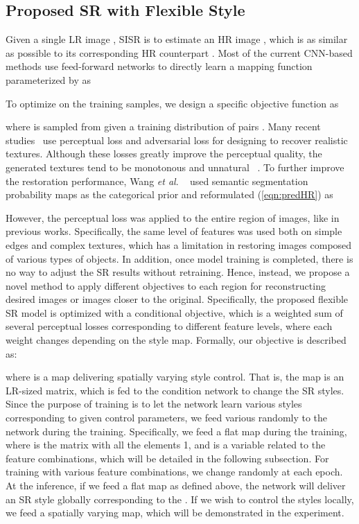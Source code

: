\documentclass{article}
\newcommand{\etal}{\textit{et al}. }
\begin{document}
\subsection{Proposed SR with Flexible Style}
Given a single LR image , SISR is to estimate an HR image , which is as similar as possible to its corresponding HR counterpart . Most of the current CNN-based methods use feed-forward networks to directly learn a mapping function  parameterized by  as

To optimize  on the training samples, we design a specific objective function  as

where  is sampled from given a training distribution of pairs . Many recent studies~\cite{2017photo, sajjadi2017enhancenet} use perceptual loss and adversarial loss for designing  to recover realistic textures. Although these losses greatly improve the perceptual quality, the generated textures tend to be monotonous and unnatural ~\cite{rad2019srobb, 2018recovering}. To further improve the restoration performance, Wang \etal~\cite{2018recovering} used semantic segmentation probability maps as the categorical prior  and reformulated (\ref{eqn:predHR}) as




However, the perceptual loss was applied to the entire region of images, like in previous works. Specifically, the same level of features was used both on simple edges and complex textures, which has a limitation in restoring images composed of various types of objects.
In addition, once model training is completed, there is no way to adjust the SR results without retraining. Hence, instead, we propose a novel method to apply different objectives to each region for reconstructing desired images or images closer to the original. Specifically, the proposed flexible SR model is optimized with a conditional objective, which is a weighted sum of several perceptual losses corresponding to different feature levels, where each weight changes depending on the style map. 
Formally, our objective is described as:



where  is a map delivering spatially varying style control. That is, the map  is an LR-sized matrix, which is fed to the condition network to change the SR styles. Since the purpose of training is to let the network learn various styles corresponding to given control parameters, we feed various  randomly to the network during the training. Specifically, we feed a flat map  during the training, where  is the matrix with all the elements 1, and  is a variable related to the feature combinations, which will be detailed in the following subsection. For training with various feature combinations, we change  randomly at each epoch. At the inference, if we feed a flat map as defined above, the network will deliver an SR style globally corresponding to the . If we wish to control the styles locally, we feed a spatially varying map, which will be demonstrated in the experiment.
\end{document}

